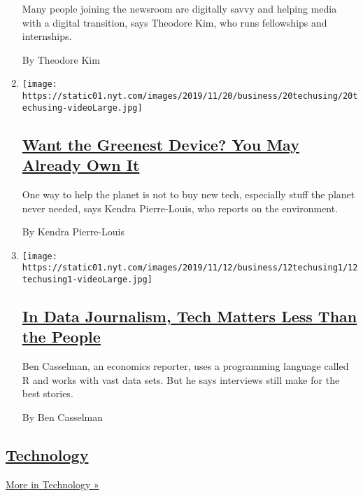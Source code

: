 \begin{enumerate}
  Many people joining the newsroom are digitally savvy and helping media
  with a digital transition, says Theodore Kim, who runs fellowships and
  internships.

  By Theodore Kim
\item
  \texttt{[image: https://static01.nyt.com/images/2019/11/20/business/20techusing/20techusing-videoLarge.jpg]}

  \hypertarget{want-the-greenest-device-you-may-already-own-it}{%
  \subsection{\texorpdfstring{\href{/2019/11/20/technology/personaltech/green-environmental-tech.html}{Want
  the Greenest Device? You May Already Own
  It}}{Want the Greenest Device? You May Already Own It}}\label{want-the-greenest-device-you-may-already-own-it}}

  One way to help the planet is not to buy new tech, especially stuff
  the planet never needed, says Kendra Pierre-Louis, who reports on the
  environment.

  By Kendra Pierre-Louis
\item
  \texttt{[image: https://static01.nyt.com/images/2019/11/12/business/12techusing1/12techusing1-videoLarge.jpg]}

  \hypertarget{in-data-journalism-tech-matters-less-than-the-people}{%
  \subsection{\texorpdfstring{\href{/2019/11/13/technology/personaltech/data-journalism-economics.html}{In
  Data Journalism, Tech Matters Less Than the
  People}}{In Data Journalism, Tech Matters Less Than the People}}\label{in-data-journalism-tech-matters-less-than-the-people}}

  Ben Casselman, an economics reporter, uses a programming language
  called R and works with vast data sets. But he says interviews still
  make for the best stories.

  By Ben Casselman
\end{enumerate}

\hypertarget{technology-1}{%
\subsection{\texorpdfstring{\href{/section/technology}{Technology}}{Technology}}\label{technology-1}}

\href{/section/technology}{More in Technology »}

